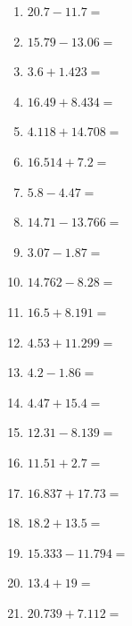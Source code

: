 \documentclass[12pt]{article}
\begin{document}
\begin{enumerate}
\item \large $ 20.7 - 11.7 = $ \vspace{1.5cm}
\newpage
\item \large $ 15.79 - 13.06 = $ \vspace{1.5cm}
\item \large $ 3.6 + 1.423 = $ \vspace{1.5cm}
\item \large $ 16.49 + 8.434 = $ \vspace{1.5cm}
\item \large $ 4.118 + 14.708 = $ \vspace{1.5cm}
\item \large $ 16.514 + 7.2 = $ \vspace{1.5cm}
\item \large $ 5.8 - 4.47 = $ \vspace{1.5cm}
\item \large $ 14.71 - 13.766 = $ \vspace{1.5cm}
\item \large $ 3.07 - 1.87 = $ \vspace{1.5cm}
\item \large $ 14.762 - 8.28 = $ \vspace{1.5cm}
\item \large $ 16.5 + 8.191 = $ \vspace{1.5cm}
\newpage
\item \large $ 4.53 + 11.299 = $ \vspace{1.5cm}
\item \large $ 4.2 - 1.86 = $ \vspace{1.5cm}
\item \large $ 4.47 + 15.4 = $ \vspace{1.5cm}
\item \large $ 12.31 - 8.139 = $ \vspace{1.5cm}
\item \large $ 11.51 + 2.7 = $ \vspace{1.5cm}
\item \large $ 16.837 + 17.73 = $ \vspace{1.5cm}
\item \large $ 18.2 + 13.5 = $ \vspace{1.5cm}
\item \large $ 15.333 - 11.794 = $ \vspace{1.5cm}
\item \large $ 13.4 + 19 = $ \vspace{1.5cm}
\item \large $ 20.739 + 7.112 = $ \vspace{1.5cm}

\end{enumerate}
\end{document}
